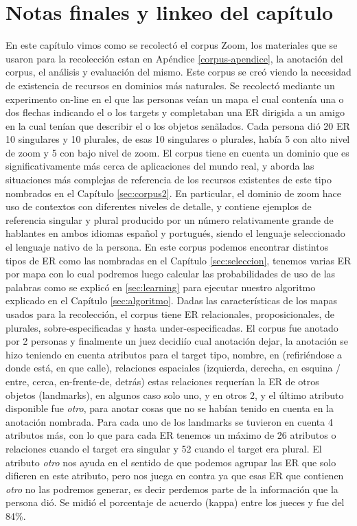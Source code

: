 \section{Notas finales y linkeo del cap\'itulo}
\label{sec-final}

En este cap\'itulo vimos como se recolect\'o el corpus Zoom, los materiales que se usaron para la recolecci\'on estan en Ap\'endice \ref{corpus-apendice}, la anotaci\'on del corpus, el an\'alisis y evaluaci\'on del mismo. 
Este corpus se cre\'o viendo la necesidad de existencia de recursos en dominios m\'as naturales. Se recolect\'o mediante un experimento on-line en el que las personas ve\'ian un mapa el cual conten\'ia una o dos flechas indicando el o los targets y completaban una ER dirigida a un amigo en la cual ten\'ian que describir el o los objetos sen\~alados. Cada persona di\'o 20 ER 10 singulares y 10 plurales, de esas 10 singulares o plurales, hab\'ia 5 con alto nivel de zoom y 5 con bajo nivel de zoom.
El corpus tiene en cuenta un dominio que es significativamente m\'as cerca de aplicaciones del mundo real, y aborda las situaciones m\'as complejas de referencia de los recursos existentes de este tipo nombrados en el Cap\'itulo \ref{sec:corpus2}. En particular, el dominio de zoom hace uso de contextos con diferentes niveles de detalle, y contiene ejemplos de referencia singular y plural producido por un n\'umero relativamente grande de hablantes en ambos idiomas espa\~nol y portugu\'es, siendo el lenguaje seleccionado el lenguaje nativo de la persona.
En este corpus podemos encontrar distintos tipos de ER como las nombradas en el Cap\'itulo \ref{sec:seleccion}, tenemos varias ER por mapa con lo cual podremos luego calcular las probabilidades de uso de las palabras como se explic\'o en \ref{sec:learning} para ejecutar nuestro algoritmo explicado en el Cap\'itulo \ref{sec:algoritmo}. Dadas las caracter\'isticas de los mapas usados para la recolecci\'on, el corpus tiene ER relacionales, proposicionales, de plurales, sobre-especificadas y hasta under-especificadas.
El corpus fue anotado por 2 personas y finalmente un juez decidi\'io cual anotaci\'on dejar, la anotaci\'on se hizo teniendo en cuenta atributos para el target tipo, nombre, en (refiri\'endose a donde est\'a, en que calle), relaciones espaciales (izquierda, derecha, en esquina / entre, cerca, en-frente-de, detr\'as) estas relaciones requer\'ian la ER de otros objetos (landmarks), en algunos caso solo uno, y en otros 2, y el \'ultimo atributo disponible fue {\it otro}, para anotar cosas que no se hab\'ian tenido en cuenta en la anotaci\'on nombrada. Para cada uno de los landmarks se tuvieron en cuenta 4 atributos m\'as, con lo que para cada ER tenemos un m\'aximo de 26 atributos o relaciones cuando el target era singular y 52 cuando el target era plural. El atributo {\it otro} nos ayuda en el sentido de que podemos agrupar las ER que solo difieren en este atributo, pero nos juega en contra ya que esas ER que contienen {\it otro} no las podremos generar, es decir perdemos parte de la informaci\'on que la persona di\'o. Se midi\'o el porcentaje de acuerdo (kappa) entre los jueces y fue del 84\%. 
